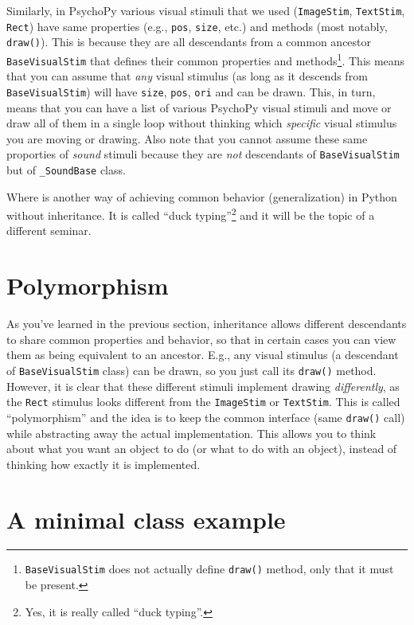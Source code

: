 \documentclass[
]{book}
\begin{document}
Similarly, in PsychoPy various visual stimuli that we used (\texttt{ImageStim}, \texttt{TextStim}, \texttt{Rect}) have same properties (e.g., \texttt{pos}, \texttt{size}, etc.) and methods (most notably, \texttt{draw()}). This is because they are all descendants from a common ancestor \texttt{BaseVisualStim} that defines their common properties and methods\footnote{\texttt{BaseVisualStim} does not actually define \texttt{draw()} method, only that it must be present.}. This means that you can assume that \emph{any} visual stimulus (as long as it descends from \texttt{BaseVisualStim}) will have \texttt{size}, \texttt{pos}, \texttt{ori} and can be drawn. This, in turn, means that you can have a list of various PsychoPy visual stimuli and move or draw all of them in a single loop without thinking which \emph{specific} visual stimulus you are moving or drawing. Also note that you cannot assume these same proporties of \emph{sound} stimuli because they are \emph{not} descendants of \texttt{BaseVisualStim} but of \texttt{\_SoundBase} class.

Where is another way of achieving common behavior (generalization) in Python without inheritance. It is called ``duck typing''\footnote{Yes, it is really called ``duck typing''.} and it will be the topic of a different seminar.

\hypertarget{polymorphism}{%
\section{Polymorphism}\label{polymorphism}}

As you've learned in the previous section, inheritance allows different descendants to share common properties and behavior, so that in certain cases you can view them as being equivalent to an ancestor. E.g., any visual stimulus (a descendant of \texttt{BaseVisualStim} class) can be drawn, so you just call its \texttt{draw()} method. However, it is clear that these different stimuli implement drawing \emph{differently}, as the \texttt{Rect} stimulus looks different from the \texttt{ImageStim} or \texttt{TextStim}. This is called ``polymorphism'' and the idea is to keep the common interface (same \texttt{draw()} call) while abstracting away the actual implementation. This allows you to think about what you want an object to do (or what to do with an object), instead of thinking how exactly it is implemented.

\hypertarget{a-minimal-class-example}{%
\section{A minimal class example}\label{a-minimal-class-example}}
\end{document}
